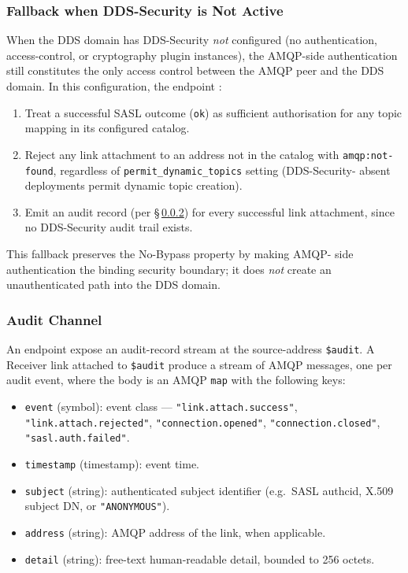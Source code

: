 \documentclass{../styles/zerodds-vendor-spec}
\begin{document}
\subsubsection{Fallback when DDS-Security is Not Active}

When the DDS domain has DDS-Security \emph{not} configured (no
authentication, access-control, or cryptography plugin instances),
the AMQP-side authentication still constitutes the only access
control between the AMQP peer and the DDS domain. In this
configuration, the endpoint :

\begin{enumerate}
  \item Treat a successful SASL outcome (\texttt{ok}) as
        sufficient authorisation for any topic mapping in its
        configured catalog.
  \item Reject any link attachment to an address not in the
        catalog with \texttt{amqp:not-found}, regardless of
        \texttt{permit\_dynamic\_topics} setting (DDS-Security-
        absent deployments  permit dynamic topic
        creation).
  \item Emit an audit record (per \S\,\ref{sec:audit-channel})
        for every successful link attachment, since no
        DDS-Security audit trail exists.
\end{enumerate}

This fallback preserves the No-Bypass property by making AMQP-
side authentication the binding security boundary; it does
\emph{not} create an unauthenticated path into the DDS domain.

\subsubsection{Audit Channel}\label{sec:audit-channel}

An endpoint  expose an audit-record stream at the
source-address \texttt{\$audit}. A Receiver link attached to
\texttt{\$audit}  produce a stream of AMQP messages,
one per audit event, where the body is an AMQP \texttt{map}
with the following keys:

\begin{itemize}
  \item \texttt{event} (symbol): event class —
        \texttt{"link.attach.success"},
        \texttt{"link.attach.rejected"},
        \texttt{"connection.opened"},
        \texttt{"connection.closed"},
        \texttt{"sasl.auth.failed"}.
  \item \texttt{timestamp} (timestamp): event time.
  \item \texttt{subject} (string): authenticated subject identifier
        (e.g.\ SASL authcid, X.509 subject DN, or
        \texttt{"ANONYMOUS"}).
  \item \texttt{address} (string): AMQP address of the link, when
        applicable.
  \item \texttt{detail} (string): free-text human-readable detail,
        bounded to 256 octets.
\end{itemize}
\end{document}
